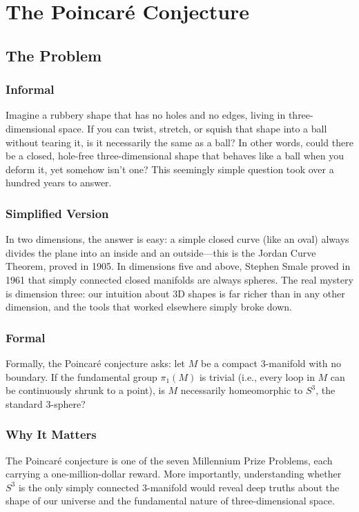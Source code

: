 \let\LocalMacro\relax

\chapter{The Poincar\'e Conjecture}

\section{The Problem}

\subsection{Informal}
Imagine a rubbery shape that has no holes and no edges, living in three-dimensional space. If you can twist, stretch, or squish that shape into a ball without tearing it, is it necessarily the same as a ball? In other words, could there be a closed, hole-free three-dimensional shape that behaves like a ball when you deform it, yet somehow isn't one? This seemingly simple question took over a hundred years to answer.

\subsection{Simplified Version}
In two dimensions, the answer is easy: a simple closed curve (like an oval) always divides the plane into an inside and an outside---this is the Jordan Curve Theorem, proved in 1905. In dimensions five and above, Stephen Smale proved in 1961 that simply connected closed manifolds are always spheres. The real mystery is dimension three: our intuition about 3D shapes is far richer than in any other dimension, and the tools that worked elsewhere simply broke down.

\subsection{Formal}
Formally, the Poincar\'e conjecture asks: let $M$ be a compact 3-manifold with no boundary. If the fundamental group $\pi_1(M)$ is trivial (i.e., every loop in $M$ can be continuously shrunk to a point), is $M$ necessarily homeomorphic to $S^3$, the standard 3-sphere?

\subsection{Why It Matters}
The Poincar\'e conjecture is one of the seven Millennium Prize Problems, each carrying a one-million-dollar reward. More importantly, understanding whether $S^3$ is the only simply connected 3-manifold would reveal deep truths about the shape of our universe and the fundamental nature of three-dimensional space.


